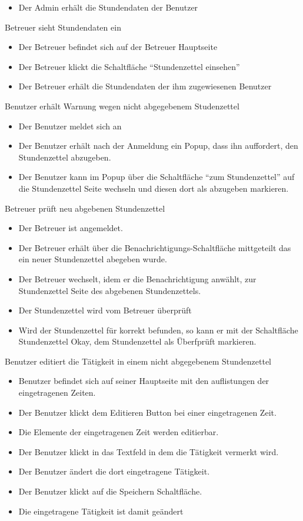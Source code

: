 \begin{requirements}
\begin{itemize}
		\item Der Admin erhält die Stundendaten der Benutzer
	\end {itemize}
	 Betreuer sieht Stundendaten ein
	\begin{itemize}
		\item Der Betreuer befindet sich auf der Betreuer Hauptseite
		\item Der Betreuer klickt die Schaltfläche "`Stundenzettel einsehen"'
		\item Der Betreuer erhält die Stundendaten der ihm zugewiesenen Benutzer
	\end {itemize}
	 Benutzer erhält Warnung wegen nicht abgegebenem Studenzettel
    \begin{itemize}
		\item Der Benutzer meldet sich an
		\item Der Benutzer erhält nach der Anmeldung ein Popup, dass ihn auffordert, den Stundenzettel abzugeben.
		\item Der Benutzer kann im Popup über die Schaltfläche "`zum Stundenzettel"' auf die Stundenzettel Seite wechseln und diesen dort als abzugeben markieren.
	\end {itemize}

	 Betreuer prüft neu abgebenen Stundenzettel
	\begin{itemize}
	    \item Der Betreuer ist angemeldet.
	    \item Der Betreuer erhält über die Benachrichtigungs-Schaltfläche mittgeteilt das ein neuer Stundenzettel abegeben wurde.
	    \item Der Betreuer wechselt, idem er die Benachrichtigung anwählt, zur Stundenzettel Seite des abgebenen Stundenzettels.
	    \item Der Stundenzettel wird vom Betreuer überprüft
	    \item Wird der Stundenzettel für korrekt befunden, so kann er mit der Schaltfläche Stundenzettel Okay, dem Stundenzettel als Überfprüft markieren.
	\end{itemize}

	 Benutzer editiert die Tätigkeit in einem nicht abgegebenem Stundenzettel
	\begin{itemize}
	    \item Benutzer befindet sich auf seiner Hauptseite mit den auflistungen der eingetragenen Zeiten.
	    \item Der Benutzer klickt dem Editieren Button bei einer eingetragenen Zeit.
	    \item Die Elemente der eingetragenen Zeit werden editierbar.
	    \item Der Benutzer klickt in das Textfeld in dem die Tätigkeit vermerkt wird.
	    \item Der Benutzer ändert die dort eingetragene Tätigkeit.
	    \item Der Benutzer klickt auf die Speichern Schaltfläche.
	    \item Die eingetragene Tätigkeit ist damit geändert
	\end{itemize}

\end{requirements}

